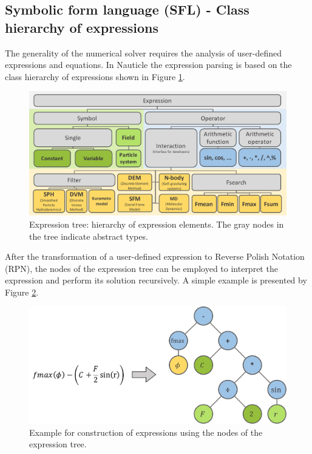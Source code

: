\documentclass[a4paper,12pt,openany]{book}
\theoremstyle{break}
\begin{document}
\subsection{Symbolic form language (SFL) - Class hierarchy of expressions}
The generality of the numerical solver requires the analysis of user-defined expressions and equations. In Nauticle the expression parsing is based on the class hierarchy of expressions shown in Figure \ref{fig:expression_tree}.
\begin{figure}[H]
  \includegraphics[scale=0.5]{expression_tree.pdf}
  \centering
  \caption{Expression tree: hierarchy of expression elements. The gray nodes in the tree indicate abstract types.}
  \label{fig:expression_tree}
\end{figure}\vspace*{3pt}

After the transformation of a user-defined expression to Reverse Polish Notation (RPN), the nodes of the expression tree can be employed to interpret the expression and perform its solution recursively. A simple example is presented by Figure \ref{fig:expression_example}.
\begin{figure}[H]
  \includegraphics[scale=0.5]{expression_example.pdf}
  \centering
  \caption{Example for construction of expressions using the nodes of the expression tree.}
  \label{fig:expression_example}
\end{figure}\vspace*{3pt}
\end{document}
